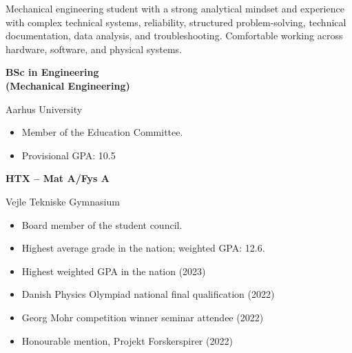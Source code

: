 \documentclass[10pt,a4paper]{article}
\begin{document}

\resumeheader

\noindent
\begin{minipage}[t]{\sidewidth}
  \vspace{0pt}
  \colorbox{CVSidebar}{%
  \begin{minipage}[t][22.50cm][t]{\dimexpr\sidewidth-2\fboxsep\relax} %
  \vspace{-10pt} %
  \hspace{3mm}%
  \begin{minipage}[t]{\dimexpr\linewidth-6mm\relax} %
    \RaggedRight %
    \small       %
    Mechanical engineering student with a strong analytical mindset and experience with complex technical systems, reliability, structured problem-solving, technical documentation, data analysis, and troubleshooting. Comfortable working across hardware, software, and physical systems.

    \textbf{BSc in Engineering\\(Mechanical Engineering)}\par
    Aarhus University\par
    \hfill{}\par
    \begin{itemize}
      \item Member of the Education Committee.
      \item Provisional GPA: 10.5
    \end{itemize}

    \vspace{3pt}{\color{CVBlueRule}\rule{\linewidth}{0.4pt}}\vspace{5pt}

    \textbf{HTX -- Mat A/Fys A}\par
    Vejle Tekniske Gymnasium\par
    \hfill{}\par
    \begin{itemize}
      \item Board member of the student council.
      \item Highest average grade in the nation; weighted GPA: 12.6.
    \end{itemize}

    \begin{itemize}
      \item Highest weighted GPA in the nation (2023)
      \item Danish Physics Olympiad national final qualification (2022)
      \item Georg Mohr competition winner seminar attendee (2022)
      \item Honourable mention, Projekt Forskerspirer (2022)
    \end{itemize}


\end{minipage}
\end{minipage}}
\end{minipage}
\end{document}
